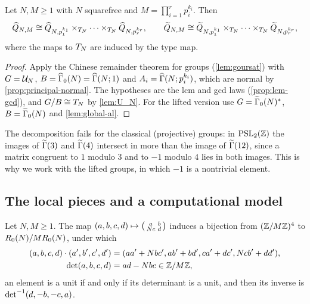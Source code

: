 \begin{theorem}\label{thm:fibre-product}
Let $N, M \geq 1$ with $N$ squarefree and $M = \prod_{i=1}^{r}p_i^{k_i}$.
Then
\[
  \widehat{Q}_{N,M} \cong
  \widehat{Q}_{N,p_1^{k_1}} \times_{T_{N}} \cdots
  \times_{T_{N}} \widehat{Q}_{N,p_r^{k_r}},
  \qquad
  \widetilde{Q}_{N,M} \cong
  \widetilde{Q}_{N,p_1^{k_1}} \times_{T_{N}} \cdots
  \times_{T_{N}} \widetilde{Q}_{N,p_r^{k_r}},
\]
where the maps to $T_{N}$ are induced by the type map.
\end{theorem}

\begin{proof}
Apply the Chinese remainder theorem for groups (\cref{lem:goursat}) with
$G = \mathcal{U}_{N}$, $B = \GammaZero[ad]{N} = \GammaPrincipal[ad]{N}{1}$ and
$A_i = \GammaPrincipal[ad]{N}{p_i^{k_i}}$, which are normal by
\cref{prop:principal-normal}. The hypotheses are the lcm and gcd laws
(\cref{prop:lcm-gcd}), and $G/B \cong T_{N}$ by \cref{lem:U_N}. For
the lifted version use $G = \GammaZeroStar[lift]{N}$,
$B = \GammaZero[lift]{N}$ and \cref{lem:global-al}.
\end{proof}

\begin{remark}[Signs]\label{rem:signs}
The decomposition fails for the classical (projective) groups:
in $\PSL{2}{\ZZ}$ the images of $\GammaFull[lift]{3}$ and $\GammaFull[lift]{4}$
intersect in more than the image of $\GammaFull[lift]{12}$, since a matrix
congruent to $1$ modulo $3$ and to $-1$ modulo $4$ lies in both images.
This is why we work with the lifted groups, in which $-1$ is a nontrivial
element.
\end{remark}

\subsection{The local pieces and a computational model}

\begin{proposition}\label{prop:eichler-model}
Let $N, M \geq 1$. The map
$(a,b,c,d) \mapsto \left(\begin{smallmatrix} a & b \\ Nc & d \end{smallmatrix}\right)$ induces a bijection
from $(\mathbb{Z}/M\mathbb{Z})^{4}$ to $R_{0}(N)/MR_{0}(N)$, under
which
\begin{align*}
  (a,b,c,d)\cdot(a',b',c',d') &=
  (aa' + Nbc',ab' + bd',ca' + dc',Ncb' + dd'),\\
  \det(a,b,c,d) &= ad - Nbc \in \mathbb{Z}/M\mathbb{Z},
\end{align*}
an element is a unit if and only if its determinant is a unit, and then its
inverse is $\det^{-1}(d,-b,-c,a)$.
\end{proposition}

